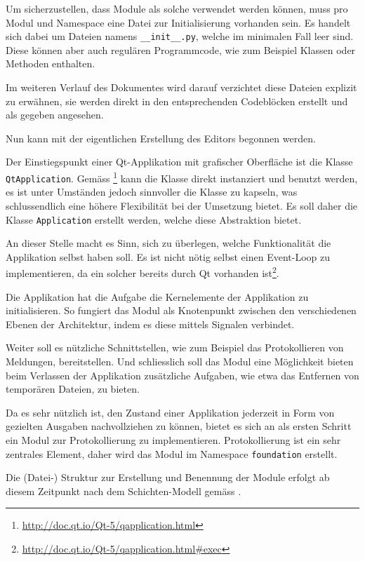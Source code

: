 \documentclass[10pt, openright, notitlepage]{scrreprt}
\begin{document}
Um sicherzustellen, dass Module als solche verwendet werden können, muss pro
Modul und Namespace eine Datei zur Initialisierung vorhanden sein. Es handelt sich
dabei um Dateien namens \texttt{\_\_init\_\_.py}, welche im minimalen Fall leer sind. Diese
können aber auch regulären Programmcode, wie zum Beispiel Klassen oder Methoden
enthalten.

Im weiteren Verlauf des Dokumentes wird darauf verzichtet diese Dateien explizit
zu erwähnen, sie werden direkt in den entsprechenden Codeblöcken erstellt und
als gegeben angesehen.

Nun kann mit der eigentlichen Erstellung des Editors begonnen werden.

Der Einstiegspunkt einer Qt-Applikation mit grafischer Oberfläche ist die Klasse
\texttt{QtApplication}. Gemäss \footnote{\url{http://doc.qt.io/Qt-5/qapplication.html}} kann die
Klasse direkt instanziert und benutzt werden, es ist unter Umständen jedoch
sinnvoller die Klasse zu kapseln, was schlussendlich eine höhere Flexibilität
bei der Umsetzung bietet. Es soll daher die Klasse \texttt{Application} erstellt
werden, welche diese Abstraktion bietet.

An dieser Stelle macht es Sinn, sich zu überlegen, welche Funktionalität die
Applikation selbst haben soll. Es ist nicht nötig selbst einen Event-Loop zu
implementieren, da ein solcher bereits durch Qt vorhanden
ist\footnote{\url{http://doc.qt.io/Qt-5/qapplication.html\#exec}}.

Die Applikation hat die Aufgabe die Kernelemente der Applikation zu
initialisieren. So fungiert das Modul als Knotenpunkt zwischen den
verschiedenen Ebenen der Architektur, indem es diese mittels Signalen
verbindet.\cite[S. 37 bis 38]{osterwalder_qde_2016}

Weiter soll es nützliche Schnittstellen, wie zum Beispiel das Protokollieren
von Meldungen, bereitstellen. Und schliesslich soll das Modul eine Möglichkeit
bieten beim Verlassen der Applikation zusätzliche Aufgaben, wie etwa das
Entfernen von temporären Dateien, zu bieten.

Da es sehr nützlich ist, den Zustand einer Applikation jederzeit in Form von
gezielten Ausgaben nachvollziehen zu können, bietet es sich an als ersten
Schritt ein Modul zur Protokollierung zu implementieren.
Protokollierung ist ein sehr zentrales Element, daher wird das Modul im
Namespace \texttt{foundation} erstellt.

Die (Datei-) Struktur zur Erstellung und Benennung der Module erfolgt ab diesem
Zeitpunkt nach dem Schichten-Modell gemäss \cite[S. 40]{osterwalder_qde_2016}.
\end{document}
